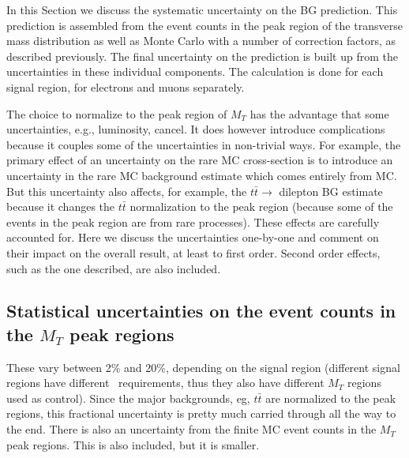 
In this Section we discuss the systematic uncertainty on the BG
prediction.  This prediction is assembled from the event
counts in the peak region of the transverse mass distribution as
well as Monte Carlo 
with a number of correction factors, as described previously.
The
final uncertainty on the prediction is built up from the uncertainties in these
individual 
components. 
The calculation is done for each signal
region,
for electrons and muons separately.

The choice to normalize to the peak region of $M_T$ has the
advantage that some uncertainties, e.g., luminosity, cancel.
It does however introduce complications because it couples
some of the uncertainties in non-trivial ways.  For example, 
the primary effect of an uncertainty on the rare MC cross-section
is to introduce an uncertainty in the rare MC background estimate
which comes entirely from MC.   But this uncertainty also affects,
for example,
the $t\bar{t} \to$ dilepton BG estimate because it changes the 
$t\bar{t}$ normalization to the peak region (because some of the 
events in the peak region are from rare processes).  These effects
are carefully accounted for.  
Here we discuss the uncertainties one-by-one and comment 
on their impact on the overall result, at least to first order.
Second order effects, such as the one described, are also included.

\subsection{Statistical uncertainties on the event counts in the $M_T$
peak regions}
These vary between 2\% and 20\%, depending on the signal region
(different
signal regions have different \met\ requirements, thus they also have
different $M_T$ regions used as control).
Since 
the major backgrounds, eg, $t\bar{t}$ are normalized to the peak regions, this 
fractional uncertainty is pretty much carried through all the way to
the end.  There is also an uncertainty from the finite MC event counts
in the $M_T$ peak regions.  This is also included, but it is smaller.


